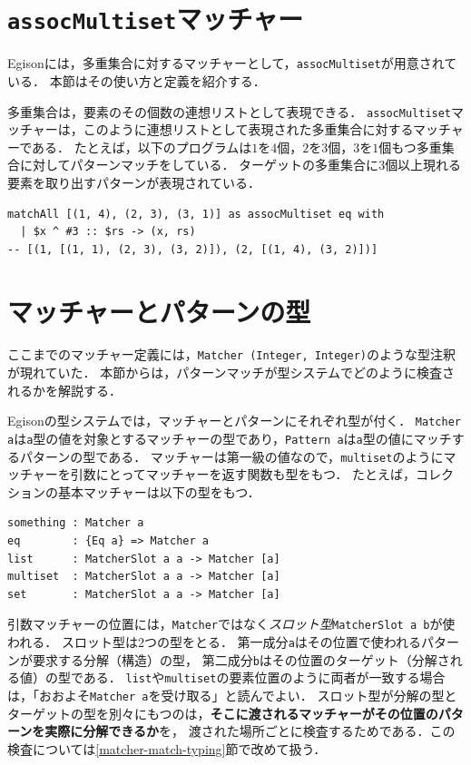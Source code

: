 \section{\texttt{assocMultiset}マッチャー}\label{matcher-assoc}

Egisonには，多重集合に対するマッチャーとして，\lstinline{assocMultiset}が用意されている．
本節はその使い方と定義を紹介する．

多重集合は，要素のその個数の連想リストとして表現できる．
\lstinline{assocMultiset}マッチャーは，このように連想リストとして表現された多重集合に対するマッチャーである．
たとえば，以下のプログラムは$1$を$4$個，$2$を$3$個，$3$を$1$個もつ多重集合に対してパターンマッチをしている．
ターゲットの多重集合に$3$個以上現れる要素を取り出すパターンが表現されている．
\begin{lstlisting}[language=egison]
matchAll [(1, 4), (2, 3), (3, 1)] as assocMultiset eq with
  | $x ^ #3 :: $rs -> (x, rs)
-- [(1, [(1, 1), (2, 3), (3, 2)]), (2, [(1, 4), (3, 2)])]
\end{lstlisting}

\section{マッチャーとパターンの型}\label{matcher-types}

ここまでのマッチャー定義には，\lstinline{Matcher (Integer, Integer)}のような型注釈が現れていた．
本節からは，パターンマッチが型システムでどのように検査されるかを解説する．

Egisonの型システムでは，マッチャーとパターンにそれぞれ型が付く．
\lstinline{Matcher a}は\lstinline{a}型の値を対象とするマッチャーの型であり，\lstinline{Pattern a}は\lstinline{a}型の値にマッチするパターンの型である．
マッチャーは第一級の値なので，\lstinline{multiset}のようにマッチャーを引数にとってマッチャーを返す関数も型をもつ．
たとえば，コレクションの基本マッチャーは以下の型をもつ．
\begin{lstlisting}[language=egison,numbers=none]
something : Matcher a
eq        : {Eq a} => Matcher a
list      : MatcherSlot a a -> Matcher [a]
multiset  : MatcherSlot a a -> Matcher [a]
set       : MatcherSlot a a -> Matcher [a]
\end{lstlisting}
引数マッチャーの位置には，\lstinline{Matcher}ではなく\emph{スロット型}\lstinline{MatcherSlot a b}が使われる．
スロット型は2つの型をとる．
第一成分\lstinline{a}はその位置で使われるパターンが要求する分解（構造）の型，
第二成分\lstinline{b}はその位置のターゲット（分解される値）の型である．
\lstinline{list}や\lstinline{multiset}の要素位置のように両者が一致する場合は，「おおよそ\lstinline{Matcher a}を受け取る」と読んでよい．
スロット型が分解の型とターゲットの型を別々にもつのは，\textbf{そこに渡されるマッチャーがその位置のパターンを実際に分解できるか}を，
渡された場所ごとに検査するためである．この検査については\ref{matcher-match-typing}節で改めて扱う．

